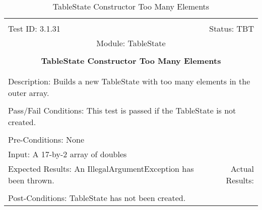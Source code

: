 \documentclass[titlepage]{article}
\begin{document}
\begin{center}%
\begin{table}
\begin{tabular}{|l r|}\hline&\\[-2mm]
	Test ID: 3.1.31	&Status: TBT\\[-3mm]
	\multicolumn{2}{|c|}{Module: TableState}\\&\\
	\multicolumn{2}{|c|}{\textbf{\large{TableState Constructor Too Many Elements}}}\\&\\\hline&\\[-3mm]
	\multicolumn{2}{|p{\textwidth}|}{Description: Builds a new TableState with too many elements in the outer array.}\\[1mm]\hline&\\[-3mm]
	\multicolumn{2}{|p{\textwidth}|}{Pass/Fail Conditions: This test is passed if the TableState is not created.}\\[1mm]\hline&\\[-3mm]
	\multicolumn{2}{|p{\textwidth}|}{Pre-Conditions: None}\\[4mm]
	\multicolumn{2}{|p{\textwidth}|}{Input: A 17-by-2 array of doubles}\\[2mm]\hline
	\multicolumn{1}{|p{0.49\textwidth}}{Expected Results: An IllegalArgumentException has been thrown.}	&\multicolumn{1}{|p{0.45\textwidth}|}{Actual Results: }\\\hline&\\[-3mm]
	\multicolumn{2}{|p{\textwidth}|}{Post-Conditions: TableState has not been created.}\\\hline
\end{tabular}
\caption{TableState Constructor Too Many Elements}
\end{table}
\end{center}
\end{document}
